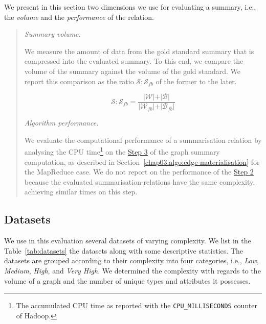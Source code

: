 We present in this section two dimensions we use for evaluating a summary, i.e., the \emph{volume} and the \emph{performance} of the relation.

\begin{quotation}
	\item[\emph{Summary volume.}]

	We measure the amount of data from the gold standard summary that is compressed into the evaluated summary. To this end, we compare the volume of the summary against the volume of the gold standard. We report this comparison as the ratio  $\mathcal{S}:\mathcal{S}_{fb}$ of the former to the later.

	$$
	\mathcal{S}:\mathcal{S}_{fb} = \frac{\vert \mathcal{W} \vert + \vert \mathcal{B} \vert}{\vert \mathcal{W}_{fb} \vert + \vert \mathcal{B}_{fb} \vert}
	$$

	\item[\emph{Algorithm performance.}]

	We evaluate the computational performance of a summarisation relation by analysing the CPU time\footnote{The accumulated CPU time as reported with the \texttt{CPU\_MILLISECONDS} counter of Hadoop.} on the \hyperref[step-he]{Step 3} of the graph summary computation, as described in Section~\ref{chap03:algo:edge-materialisation} for the MapReduce case. We do not report on the performance of the \hyperref[step-hn]{Step 2} because the evaluated \glspl{summarisation-relation} have the same complexity, achieving similar times on this step.
\end{quotation}

\subsection{Datasets}
\label{sec:eval:datasets}

We use in this evaluation several datasets of varying complexity. We list in the Table~\ref{tab:datasets} the datasets along with some descriptive statistics. The datasets are grouped according to their complexity into four categories, i.e., \emph{Low}, \emph{Medium}, \emph{High}, and \emph{Very High}. We determined the complexity with regards to the volume of a graph and the number of unique types and attributes it possesses.

